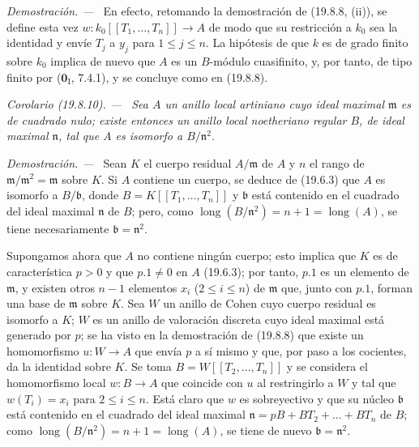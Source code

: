 \documentclass[10pt,oneside]{book}
\makeatletter
\newcommand{\setmanualcurrentlabel}[1]{\def\@currentlabel{#1}}
\newenvironment{corollary}[1][]{%
  \setmanualcurrentlabel{#1}\par\medskip\noindent\itshape Corolario (#1). ---\ }{\par}
\newenvironment{proof}{%
  \par\medskip\noindent\textit{Demostración. ---\ }}{\par}
\providecommand{\setmin}{-}%
\makeatother
\begin{document}
\begin{proof}
En efecto, retomando la demostración de (19.8.8, (ii)), se define esta vez
$w:k_0[[T_1,\ldots,T_n]]\to A$ de modo que su restricción a $k_0$ sea la
identidad y envíe $T_j$ a $y_j$ para $1\leq j\leq n$. La hipótesis de que $k$ es de
grado finito sobre $k_0$ implica de nuevo que $A$ es un $B$-módulo cuasifinito,
y, por tanto, de tipo finito por ($\mathbf 0_{\mathrm I}$, 7.4.1), y se
concluye como en (19.8.8).
\end{proof}

\begin{corollary}[19.8.10]
\label{0.19.8.10-es}
Sea $A$ un anillo local artiniano cuyo ideal maximal $\mathfrak m$ es de
cuadrado nulo; existe entonces un anillo local noetheriano regular $B$, de
ideal maximal $\mathfrak n$, tal que $A$ es isomorfo a
$B/\mathfrak n^2$.
\end{corollary}

\begin{proof}
Sean $K$ el cuerpo residual $A/\mathfrak m$ de $A$ y $n$ el rango de
$\mathfrak m/\mathfrak m^2=\mathfrak m$ sobre $K$. Si $A$ contiene un cuerpo,
se deduce de (19.6.3) que $A$ es isomorfo a $B/\mathfrak b$, donde
$B=K[[T_1,\ldots,T_n]]$ y $\mathfrak b$ está contenido en el cuadrado del
ideal maximal $\mathfrak n$ de $B$; pero, como
$\operatorname{long}(B/\mathfrak n^2)=n+1=\operatorname{long}(A)$, se tiene
necesariamente $\mathfrak b=\mathfrak n^2$.

Supongamos ahora que $A$ no contiene ningún cuerpo; esto implica que $K$ es
de característica $p>0$ y que $p.1\neq0$ en $A$ (19.6.3); por tanto,
$p.1$ es un elemento de $\mathfrak m$, y existen otros $n\setmin 1$ elementos
$x_i$ ($2\leq i\leq n$) de $\mathfrak m$ que, junto con $p.1$, forman una
base de $\mathfrak m$ sobre $K$. Sea $W$ un anillo de Cohen cuyo cuerpo
residual es isomorfo a $K$; $W$ es un anillo de valoración discreta cuyo ideal
maximal está generado por $p$; se ha visto en la demostración de (19.8.8) que
existe un homomorfismo $u:W\to A$ que envía $p$ a sí mismo y que, por paso
a los cocientes, da la identidad sobre $K$. Se toma
$B=W[[T_2,\ldots,T_n]]$ y se considera el homomorfismo local $w:B\to A$ que
coincide con $u$ al restringirlo a $W$ y tal que $w(T_i)=x_i$ para $2\leq i\leq n$. Está
claro que $w$ es sobreyectivo y que su núcleo $\mathfrak b$ está contenido en
el cuadrado del ideal maximal $\mathfrak n=pB+BT_2+\ldots+BT_n$ de $B$; como
$\operatorname{long}(B/\mathfrak n^2)=n+1=\operatorname{long}(A)$, se tiene
de nuevo $\mathfrak b=\mathfrak n^2$.
\end{proof}
\end{document}
